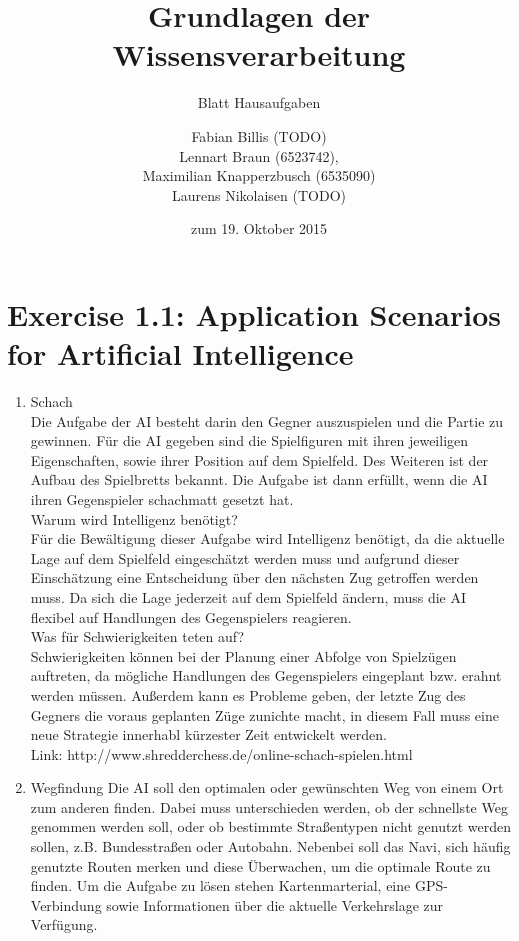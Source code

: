 \documentclass[a4paper]{scrartcl}
\title{Grundlagen der Wissensverarbeitung}
\subtitle{Blatt \blattnr Hausaufgaben}
\author{
    Fabian Billis (TODO) \\
    Lennart Braun (6523742), \\
    Maximilian Knapperzbusch (6535090) \\
    Laurens Nikolaisen (TODO)
}
\date{zum 19. Oktober 2015}
\begin{document}
\maketitle

\section*{Exercise 1.1: Application Scenarios for Artificial Intelligence}
  \begin{enumerate}
    \item{Schach} \\
      Die Aufgabe der AI besteht darin den Gegner auszuspielen und die Partie zu
      gewinnen. Für die AI gegeben sind die Spielfiguren mit ihren jeweiligen
      Eigenschaften, sowie ihrer Position auf dem Spielfeld. Des Weiteren ist der
      Aufbau des Spielbretts bekannt.
      Die Aufgabe ist dann erfüllt, wenn die AI ihren Gegenspieler schachmatt gesetzt
      hat. \\

      Warum wird Intelligenz benötigt? \\
      Für die Bewältigung dieser Aufgabe wird Intelligenz benötigt, da die aktuelle
      Lage auf dem Spielfeld eingeschätzt werden muss und aufgrund dieser Einschätzung
      eine Entscheidung über den nächsten Zug getroffen werden muss. Da sich die Lage
      jederzeit auf dem Spielfeld ändern, muss die AI flexibel auf Handlungen
      des Gegenspielers reagieren. \\

      Was für Schwierigkeiten teten auf?\\
      Schwierigkeiten können bei der Planung einer Abfolge von Spielzügen auftreten,
      da mögliche Handlungen des Gegenspielers eingeplant bzw. erahnt werden müssen.
      Außerdem kann es Probleme geben, der letzte Zug des Gegners die voraus geplanten
      Züge zunichte macht, in diesem Fall muss eine neue Strategie innerhabl kürzester
      Zeit entwickelt werden. \\

      Link: http://www.shredderchess.de/online-schach-spielen.html \\



    \item{Wegfindung}
      Die AI soll den optimalen oder gewünschten Weg von einem Ort zum anderen finden.
      Dabei muss unterschieden werden, ob der schnellste Weg genommen werden soll, oder
      ob bestimmte Straßentypen nicht genutzt werden sollen, z.B. Bundesstraßen oder
      Autobahn. Nebenbei soll das Navi, sich häufig genutzte Routen merken und diese Überwachen, um
      die optimale Route zu finden. Um die Aufgabe zu lösen stehen Kartenmarterial, eine GPS-Verbindung
      sowie Informationen über die aktuelle Verkehrslage zur Verfügung.  \\


\end{enumerate}
\end{document}
